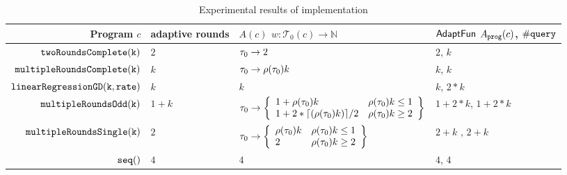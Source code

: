 \begin {table}[H]
        \vspace{-0.3cm}
    \caption{Experimental results of {\THESYSTEM} implementation}
        \label{tb:imp}
        \begin{center}
        \centering
{\footnotesize
        \begin{tabular}{ r | p{12mm} p{55mm} p{\textwidth}}
         Program $c$ & adaptive \newline rounds & $A(c)$ \newline $w: \mathcal{T}_0(c) \to \mathbb{N}$ & $\textsf{AdaptFun}$ \newline $A_{\mathtt{prog}}(c)$, $\# {\tt query}$ \\ 
         \hline
         $  \mathtt{twoRoundsComplete(k)}$ & $2$ & $\mathtt{\tau}_0 \to 2$ & $2$, $k$ \\
         $  \mathtt{multipleRoundsComplete(k)}$ & $k$ & $\mathtt{\tau}_0 \to \rho(\mathtt{\tau}_0) k$ & $k$, $k$  \\
         $  \mathtt{linearRegressionGD(k, rate)}$ & $k$ & $k$ & $k$, $2 * k$  \\
         $  \mathtt{multipleRoundsOdd(k)}$ & $1 + k$ 
                                    & $
                                        \trace_0 \to 
                                        \left\{\begin{array}{ll}
                                        1 + \env(\trace_0) k & \env(\trace_0) k  \leq 1 \\
                                        1 + 2 * \lceil{(\env(\trace_0) k)} \rceil / 2 & \env(\trace_0) k \geq 2
                                        \end{array}\right\}
                                        $ 
              & $1 + 2*k$, $1 + 2*k$  \\
         $  \mathtt{multipleRoundsSingle(k)}$    & $2$ 
                                            & $
                                                \trace_0 \to 
                                                \left\{\begin{array}{ll}
                                                \env(\trace_0) k & \env(\trace_0) k  \leq 1 \\
                                                2 & \env(\trace_0) k \geq 2
                                                \end{array}\right\}
                                                $ 
                                            & $2 + k$ , $2 + k$  \\
         $\mathtt{seq()}$ & $4$ & $4$ & $4$, $4$  \\ 

\end{tabular}}
\end{center}
\end{table}
